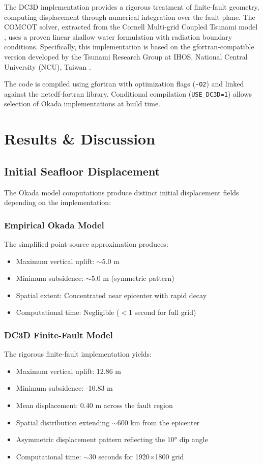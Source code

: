 \documentclass[12pt]{article}
\begin{document}
The DC3D implementation provides a rigorous treatment of finite-fault geometry, computing displacement through numerical integration over the fault plane. The COMCOT solver, extracted from the Cornell Multi-grid Coupled Tsunami model \cite{comcot}, uses a proven linear shallow water formulation with radiation boundary conditions. Specifically, this implementation is based on the gfortran-compatible version developed by the Tsunami Research Group at IHOS, National Central University (NCU), Taiwan \cite{comcot_gfortran}.

The code is compiled using gfortran with optimization flags (\texttt{-O2}) and linked against the netcdf-fortran library. Conditional compilation (\texttt{USE\_DC3D=1}) allows selection of Okada implementations at build time.

\section{Results \& Discussion}

\subsection{Initial Seafloor Displacement}

The Okada model computations produce distinct initial displacement fields depending on the implementation:

\subsubsection{Empirical Okada Model}
The simplified point-source approximation produces:
\begin{itemize}
    \item Maximum vertical uplift: $\sim$5.0 m
    \item Minimum subsidence: $\sim$5.0 m (symmetric pattern)
    \item Spatial extent: Concentrated near epicenter with rapid decay
    \item Computational time: Negligible ($<$1 second for full grid)
\end{itemize}

\subsubsection{DC3D Finite-Fault Model}
The rigorous finite-fault implementation yields:
\begin{itemize}
    \item Maximum vertical uplift: 12.86 m
    \item Minimum subsidence: -10.83 m
    \item Mean displacement: 0.40 m across the fault region
    \item Spatial distribution extending $\sim$600 km from the epicenter
    \item Asymmetric displacement pattern reflecting the 10° dip angle
    \item Computational time: $\sim$30 seconds for 1920$\times$1800 grid
\end{itemize}
\end{document}
